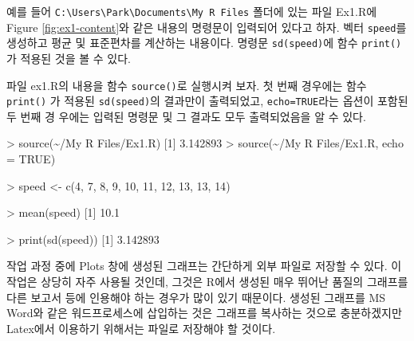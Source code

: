 \documentclass[
]{book}
\newenvironment{Shaded}{\begin{snugshade}}{\end{snugshade}}
\newcommand{\AttributeTok}[1]{\textcolor[rgb]{0.77,0.63,0.00}{#1}}
\newcommand{\ConstantTok}[1]{\textcolor[rgb]{0.00,0.00,0.00}{#1}}
\newcommand{\DecValTok}[1]{\textcolor[rgb]{0.00,0.00,0.81}{#1}}
\newcommand{\FloatTok}[1]{\textcolor[rgb]{0.00,0.00,0.81}{#1}}
\newcommand{\FunctionTok}[1]{\textcolor[rgb]{0.00,0.00,0.00}{#1}}
\newcommand{\NormalTok}[1]{#1}
\newcommand{\OtherTok}[1]{\textcolor[rgb]{0.56,0.35,0.01}{#1}}
\newcommand{\SpecialCharTok}[1]{\textcolor[rgb]{0.00,0.00,0.00}{#1}}
\newcommand{\StringTok}[1]{\textcolor[rgb]{0.31,0.60,0.02}{#1}}
\begin{document}
예를 들어 \texttt{C:\textbackslash{}Users\textbackslash{}Park\textbackslash{}Documents\textbackslash{}My\ R\ Files} 폴더에 있는 파일 Ex1.R에
Figure \ref{fig:ex1-content}와 같은 내용의 명령문이 입력되어 있다고
하자. 벡터 \texttt{speed}를 생성하고 평균 및 표준편차를 계산하는 내용이다. 명령문
\texttt{sd(speed)}에 함수 \texttt{print()}가 적용된 것을 볼 수 있다.

파일 ex1.R의 내용을 함수 \texttt{source()}로 실행시켜 보자. 첫 번째 경우에는
함수 \texttt{print()} 가 적용된 \texttt{sd(speed)}의 결과만이 출력되었고,
\texttt{echo=TRUE}라는 옵션이 포함된 두 번째 경 우에는 입력된 명령문 및 그
결과도 모두 출력되었음을 알 수 있다.

\begin{Shaded}
\begin{Highlighting}[]
\SpecialCharTok{\textgreater{}} \FunctionTok{source}\NormalTok{(}\StringTok{\textquotesingle{}\textasciitilde{}/My R Files/Ex1.R\textquotesingle{}}\NormalTok{)}
\NormalTok{[}\DecValTok{1}\NormalTok{] }\FloatTok{3.142893}
\SpecialCharTok{\textgreater{}} \FunctionTok{source}\NormalTok{(}\StringTok{\textquotesingle{}\textasciitilde{}/My R Files/Ex1.R\textquotesingle{}}\NormalTok{, }\AttributeTok{echo =} \ConstantTok{TRUE}\NormalTok{)}

\SpecialCharTok{\textgreater{}}\NormalTok{ speed }\OtherTok{\textless{}{-}} \FunctionTok{c}\NormalTok{(}\DecValTok{4}\NormalTok{, }\DecValTok{7}\NormalTok{, }\DecValTok{8}\NormalTok{, }\DecValTok{9}\NormalTok{, }\DecValTok{10}\NormalTok{, }\DecValTok{11}\NormalTok{, }\DecValTok{12}\NormalTok{, }\DecValTok{13}\NormalTok{, }\DecValTok{13}\NormalTok{, }\DecValTok{14}\NormalTok{)}

\SpecialCharTok{\textgreater{}} \FunctionTok{mean}\NormalTok{(speed)}
\NormalTok{[}\DecValTok{1}\NormalTok{] }\FloatTok{10.1}

\SpecialCharTok{\textgreater{}} \FunctionTok{print}\NormalTok{(}\FunctionTok{sd}\NormalTok{(speed))}
\NormalTok{[}\DecValTok{1}\NormalTok{] }\FloatTok{3.142893}
\end{Highlighting}
\end{Shaded}

작업 과정 중에 Plots 창에 생성된 그래프는 간단하게 외부 파일로 저장할 수
있다. 이 작업은 상당히 자주 사용될 것인데, 그것은 R에서 생성된 매우
뛰어난 품질의 그래프를 다른 보고서 등에 인용해야 하는 경우가 많이 있기
때문이다. 생성된 그래프를 MS Word와 같은 워드프로세스에 삽입하는 것은
그래프를 복사하는 것으로 충분하겠지만 Latex에서 이용하기 위해서는 파일로
저장해야 할 것이다.
\end{document}
